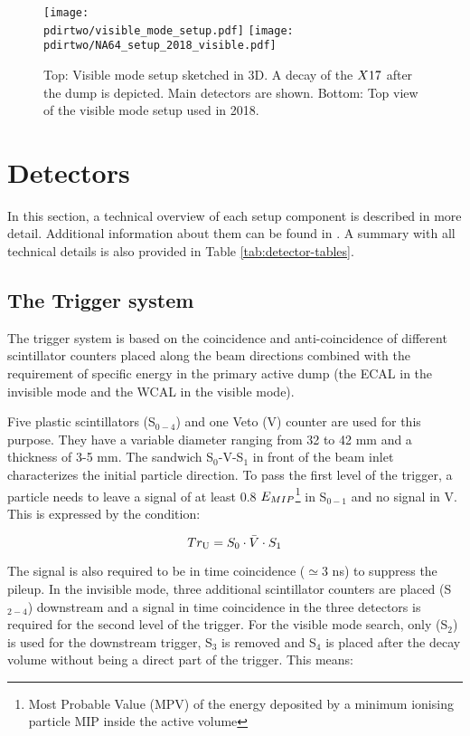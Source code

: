 \begin{figure}[tb]
  \centering
  \texttt{[image: \\pdirtwo/visible\_mode\_setup.pdf]}  
  \texttt{[image: \\pdirtwo/NA64\_setup\_2018\_visible.pdf]}
  \caption[NA64 visible mode setup 2018]{Top: Visible mode setup sketched in 3D. A decay of the $X17$ after the dump is depicted. Main detectors are shown. Bottom: Top view of the visible mode setup used in 2018.}
  \label{fig:setup-vis-2018}
\end{figure}

\section{Detectors}
\label{ch2:sec:detectors}

In this section, a technical overview of each setup component is described in more detail. Additional information about them can be found in \cite{na64-hcal,na64-detectors,ABBON201569}. A summary with all technical details is also provided in Table \ref{tab:detector-tables}.

\subsection{The Trigger system}
\label{ch2:sec:detectors-trigger}

The trigger system is based on the coincidence and anti-coincidence of different scintillator counters placed along the beam directions combined with the requirement of specific energy in the primary active dump (the ECAL in the invisible mode and the WCAL in the visible mode).

Five plastic scintillators (S$_{0-4}$) and one Veto (V) counter are used for this purpose. They have a variable diameter ranging from 32 to 42 \si{mm} and a thickness of 3-5 \si{mm}. The sandwich S$_0$-V-S$_1$ in front of the beam inlet characterizes the initial particle direction. To pass the first level of the trigger, a particle needs to leave a signal of at least 0.8 $E_{MIP}$\footnote{Most Probable Value (MPV) of the energy deposited by a minimum ionising particle MIP inside the active volume} in S$_{0-1}$ and no signal in V. This is expressed by the condition:

\begin{equation}
\label{eq:trigger-upstream}
Tr_{\rm{U}} = S_0 \cdot \bar{V} \cdot S_1
\end{equation}

The signal is also required to be in time coincidence ($\simeq$3 \si{ns}) to suppress the pileup. In the invisible mode, three additional scintillator counters are placed (S$_{2-4}$) downstream and a signal in time coincidence in the three detectors is required for the second level of the trigger. For the visible mode search, only (S$_2$) is used for the downstream trigger, S$_3$ is removed and S$_4$ is placed after the decay volume without being a direct part of the trigger. This means:

